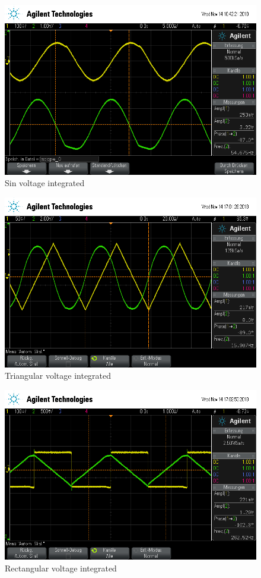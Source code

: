 \begin{figure}[H]
\centering
\includegraphics[scale=.48]{V51Bilder/inSin.png}
\caption{Sin voltage integrated}\label{fig:int1}
\end{figure}
\begin{figure}[H]
\centering
\includegraphics[scale=.48]{V51Bilder/intTri.png}
\caption{Triangular voltage integrated}\label{fig:int2}
\end{figure}
\begin{figure}[H]
\centering
\includegraphics[scale=.48]{V51Bilder/intRect.png}
\caption{Rectangular voltage integrated}\label{fig:int3}
\end{figure}


